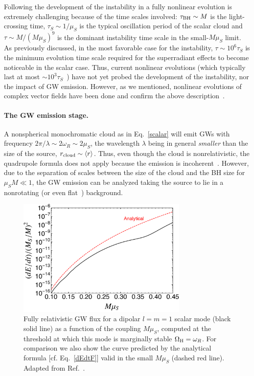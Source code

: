 \documentclass[11pt]{article}
\numberwithin{equation}{section} %
\begin{document}
Following the development of the instability in a fully nonlinear evolution is extremely challenging because of the time scales involved: $\tau_{\rm BH}\sim M$ is the light-crossing time, $\tau_S\sim 1/\mu_S$ is the typical oscillation period of the scalar cloud and $\tau \sim M/(M\mu_S)^9$ is the dominant instability time scale in the small-$M\mu_S$ limit. As previously discussed, in the most favorable case for the instability, $\tau\sim 10^6\tau_S$ is the minimum evolution time scale required for the superradiant effects to become noticeable in the scalar case. Thus, current nonlinear evolutions (which typically last at most $\sim 10^3 \tau_S$~\cite{Okawa:2014nda}) have not yet probed the development of the instability, nor the impact of GW emission.
%
However, as we mentioned, nonlinear evolutions of complex vector fields have been done and confirm the above description~\cite{East:2018glu}.


\paragraph{The GW emission stage.}
A nonspherical monochromatic cloud as in Eq.~\eqref{scalar} will emit GWs with frequency $ 2\pi/\lambda\sim 2\omega_R\sim 2\mu_S$, the wavelength $\lambda$ being in general \emph{smaller} than the size of the source, $r_{\rm cloud}\sim\langle r\rangle$. Thus, even though the cloud is nonrelativistic, the quadrupole formula does not apply because the emission is incoherent~\cite{Arvanitaki:2010sy,Yoshino:2013ofa,Brito:2014wla,Yoshino:2015nsa}. However, due to the separation of scales between the size of the cloud and the BH size for $\mu_S M\ll 1$, the GW emission can be analyzed taking the source to lie in a nonrotating (or even flat~\cite{Yoshino:2013ofa}) background.


%
\begin{figure}[t]
\centering
\includegraphics[width=0.75\textwidth]{GW_flux.pdf}
\caption{Fully relativistic GW flux for a dipolar $l=m=1$ scalar mode (black solid line) as a function of the coupling $M\mu_S$, computed at the threshold at which this mode is marginally stable $\Omega_{\rm H}=\omega_R$. For comparison we also show the curve predicted by the analytical formula [cf. Eq.~\eqref{dEdtF}] valid in the small $M\mu_S$ (dashed red line). Adapted from Ref.~\cite{Brito:2017zvb}.
\label{fig:GW_flux}
}
\end{figure}
%
\end{document}

